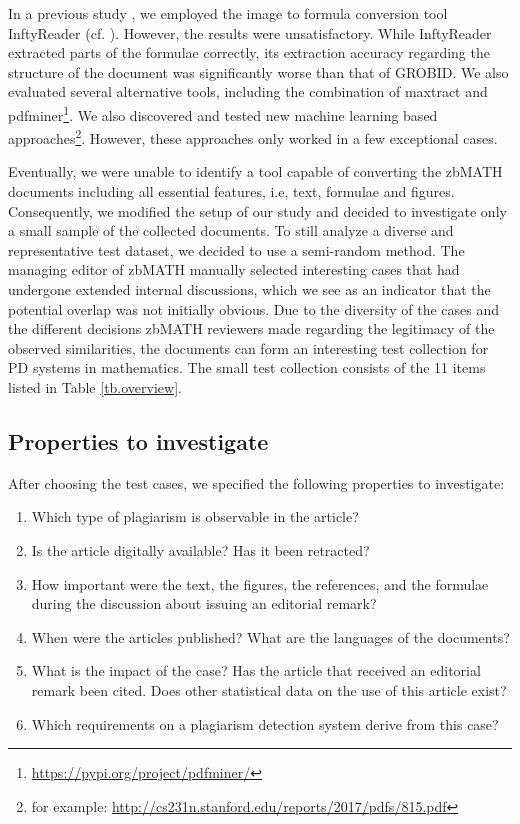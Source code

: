 \documentclass{llncs}
\begin{document}
In a previous study \cite{Meuschke2017a}, we employed the image to formula conversion tool InftyReader (cf. ). However, the results were unsatisfactory. While InftyReader extracted parts of the formulae correctly, its extraction accuracy regarding the structure of the document was significantly worse than that of GROBID. We also evaluated several alternative tools, including the combination of maxtract \cite{maxtract} and pdfminer\footnote{\url{https://pypi.org/project/pdfminer/}}.
We also discovered and tested new machine learning based approaches\footnote{for example: \url{http://cs231n.stanford.edu/reports/2017/pdfs/815.pdf}}. However, these approaches only worked in a few exceptional cases.

Eventually, we were unable to identify a tool capable of converting the zbMATH documents including all essential features, i.e, text, formulae and figures. Consequently, we modified the setup of our study and decided to investigate only a small sample of the collected documents. To still analyze a diverse and representative test dataset, we decided to use a semi-random method. The managing editor of zbMATH manually selected interesting cases that had undergone extended internal discussions, which we see as an indicator that the potential overlap was not initially obvious. Due to the diversity of the cases and the different decisions zbMATH reviewers made regarding the legitimacy of the observed similarities, the documents can form an interesting test collection for PD systems in mathematics. The small test collection consists of the 11 items listed in Table \ref{tb.overview}.

\subsection{Properties to investigate}\label{sc.smallScale}

After choosing the test cases, we specified the following properties to investigate:
\begin{enumerate}
\item Which type of plagiarism is observable in the article?
\item Is the article digitally available? Has it been retracted?
\item How important were the text, the figures, the references, and the formulae during the discussion about issuing an editorial remark?
\item When were the articles published? What are the languages of the documents?
\item What is the impact of the case? Has the article that received an editorial remark been cited. Does other statistical data on the use of this article exist?
\item Which requirements on a plagiarism detection system derive from  this case?
\end{enumerate}
\end{document}
